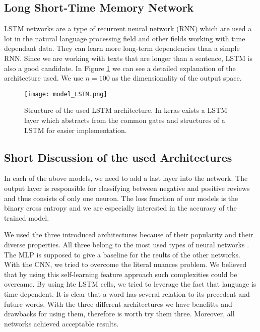 \documentclass[conference]{IEEEtran}
\theoremstyle{plain}
\theoremstyle{definition}
\theoremstyle{remark}
\begin{document}
\subsection{Long Short-Time Memory Network}
LSTM networks \cite{lstm} are a type of recurrent neural network (RNN) which are used a lot in the natural language processing field and other fields working with time dependant data. They can learn more long-term dependencies than a simple RNN. Since we are working with texts that are longer than a sentence, LSTM is also a good candidate. In Figure \ref{fig:lstm} we can see a detailed explanation of the architecture used. We use $n=100$ as the dimensionality of the output space. \\

\begin{figure}[bp!]
	\centering
	\texttt{[image: model\_LSTM.png]}
	\caption[bla.]{Structure of the used LSTM architecture. In keras exists a LSTM layer which abstracts from the common gates and structures of a LSTM for easier implementation.}
	\label{fig:lstm}
\end{figure}
\newpage
\subsection{Short Discussion of the used Architectures}
In each of the above models, we need to add a last layer into the network. The output layer is responsible for classifying between negative and positive reviews and thus consists of only one neuron. The loss function of our models is the binary cross entropy and we are especially interested in the accuracy of the trained model. 

We used the three introduced architectures because of their popularity and their diverse properties. All three belong to the most used types of neural networks \cite{neural_networks_overview}. The MLP is supposed to give a baseline for the reults of the other networks. With the CNN, we tried to overcome the literal nuances problem. We believed that by using this self-learning feature approach such complexities could be overcame. By using hte LSTM cells, we tried to leverage the fact that language is time dependent. It is clear that a word has several relation to its precedent and future words. With the three different architectures we have benefitts and drawbacks for using them, therefore is worth try them three. Moreover, all networks achieved acceptable results.
\end{document}
